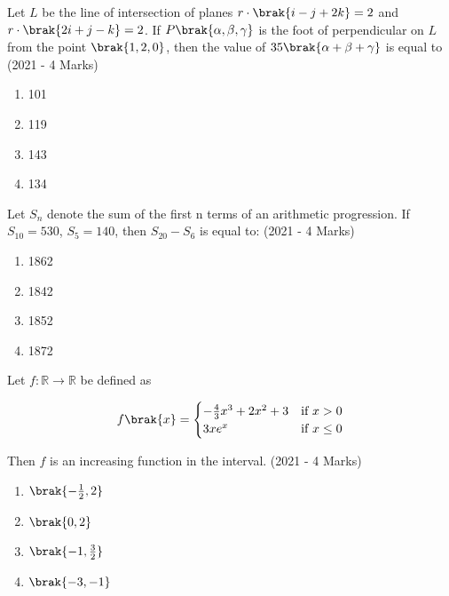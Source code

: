 \iffalse
\title{Assignment 1}
\author{Siddhanth Yellanki - ee24btech11059}
\section{mcq-single}
\fi

    \item{
          	Let $L$ be the line of intersection of planes $r \cdot \brak{i - j + 2k} = 2$ and $r \cdot \brak{2i + j - k} = 2$. If $P\brak{\alpha, \beta, \gamma}$ is the foot of perpendicular on $L$ from the point $\brak{1, 2, 0}$, then the value of $35\brak{\alpha + \beta + \gamma}$ is equal to \text{  }\hfill
                {(2021 - 4 Marks)}
                \begin{multicols}{4}
					\begin{enumerate}
						\item 101
						\item 119
						\item 143
						\item 134
					\end{enumerate}
				\end{multicols}
            }
    \item{
           	Let $S_n$ denote the sum of the first n terms of an arithmetic progression. If $S_{10} = 530$, $S_5 = 140$, then 
           	$S_{20} - S_6$ is equal to:
           	\hfill
           	{(2021 - 4 Marks)}
                \begin{multicols}{4}
                	\begin{enumerate}
                		\item 1862
                		\item 1842
                		\item 1852
                		\item 1872
                	\end{enumerate}
                \end{multicols}
        }
\item{
        	
        	Let $f : \mathbb{R} \rightarrow \mathbb{R}$ be defined as
        	
        	\[ f\brak{x} = \begin{cases} 
        		-\frac{4}{3}x^3 + 2x^2 + 3 & \text{if } x > 0 \\
        		3xe^x & \text{if } x \leq 0 
        	\end{cases} \]
        	
        	Then $f$ is an increasing function in the interval.
        	\hfill
        	{(2021 - 4 Marks)}
        	\begin{multicols}{4}
        		\begin{enumerate}
        			\item $\brak{-\frac{1}{2}, 2}$
        			\item $\brak{0,2}$
        			\item $\brak{-1,\frac{3}{2}}$
        			\item $\brak{-3,-1}$
        		\end{enumerate}
        	\end{multicols}
        	
        }
